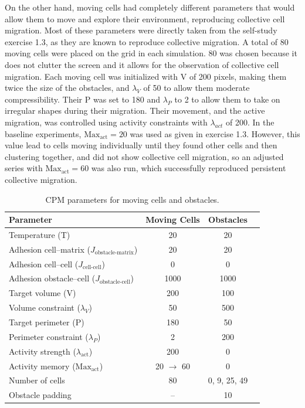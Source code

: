 \documentclass{article}
\begin{document}
On the other hand, moving cells had completely different parameters that would allow them to move and explore their environment, reproducing collective cell migration. Most of these parameters were directly taken from the self-study exercise 1.3, as they are known to reproduce collective migration. A total of 80 moving cells were placed on the grid in each simulation. 80 was chosen because it does not clutter the screen and it allows for the observation of collective cell migration. Each moving cell was initialized with V of 200 pixels, making them twice the size of the obstacles, and $\lambda_V$ of 50 to allow them moderate compressibility. Their P was set to 180 and $\lambda_P$ to 2 to allow them to take on irregular shapes during their migration. Their movement, and the active migration, was controlled using activity constraints with $\lambda_{act}$ of 200. In the baseline experiments, $\text{Max}_{\text{act}} = 20$ was used as given in exercise 1.3. However, this value lead to cells moving individually until they found other cells and then clustering together, and did not show collective cell migration, so an adjusted series with $\text{Max}_{\text{act}} = 60$ was also run, which successfully reproduced persistent collective migration.

\begin{table}[h!]
    \centering
    \caption{CPM parameters for moving cells and obstacles.}
    \label{tab:params}
    \begin{tabular}{lccc}
        \hline
        \textbf{Parameter} & \textbf{Moving Cells} & \textbf{Obstacles} \\
        \hline
        Temperature (T) & 20 & 20 \\
        Adhesion cell–matrix ($J_{\text{obstacle-matrix}}$) & 20 & 20 \\
        Adhesion cell–cell ($J_{\text{cell-cell}}$) & 0 & 0 \\
        Adhesion obstacle–cell ($J_{\text{obstacle-cell}}$) & 1000 & 1000 \\
        Target volume (V) & 200 & 100 \\
        Volume constraint ($\lambda_V$) & 50 & 500 \\
        Target perimeter (P) & 180 & 50 \\
        Perimeter constraint ($\lambda_P$) & 2 & 200 \\
        Activity strength ($\lambda_{\text{act}}$)& 200 & 0 \\
        Activity memory ($\text{Max}_{\text{act}}$)  & 20 $\to$ 60& 0 \\
        Number of cells & 80 & 0, 9, 25, 49 \\
        Obstacle padding  & -- & 10 \\
        \hline
    \end{tabular}
\end{table}
\end{document}
